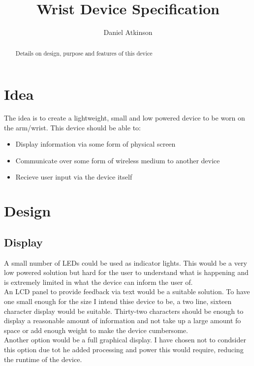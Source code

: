 \documentclass{article}
\begin{document}
\title{Wrist Device Specification}

\author{Daniel Atkinson}

\maketitle

\begin{abstract}

Details on design, purpose and features of this device

\end{abstract}


\section{Idea}
The idea is to create a lightweight, small and low powered device to be worn on the arm/wrist.
This device should be able to:
\begin{itemize}
\item Display information via some form of physical screen
\item Communicate over some form of wireless medium to another device
\item Recieve user input via the device itself
\end{itemize}
\section{Design}
\subsection{Display}
A small number of LEDs could be used as indicator lights.  This would be a very low powered solution but hard for the user to understand what is happening and is extremely limited in what the device can inform the user of.
\\An LCD panel to provide feedback via text would be a suitable solution.  To have one small enough for the size I intend thise device to be, a two line, sixteen character display would be suitable.  Thirty-two characters should be enough to display a reasonable amount of information and not take up a large amount fo space or add enough weight to make the device cumbersome.
\\Another option would be a full graphical display.  I have chosen not to condsider this option due tot he added processing and power this would require, reducing the runtime of the device.
\end{document}
